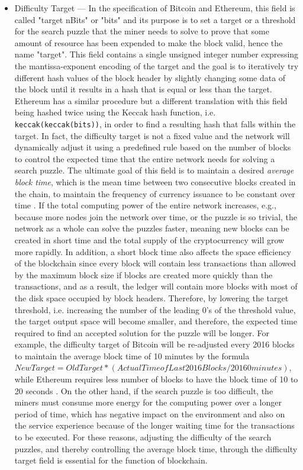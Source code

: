 \begin{itemize}
	\item Difficulty Target --- In the specification of Bitcoin and Ethereum, this field is called "target nBits" or "bits" and its purpose is to set a target or a threshold for the search puzzle that the miner needs to solve to prove that some amount of resource has been expended to make the block valid, hence the name "target". This field contains a single unsigned integer number expressing the mantissa-exponent encoding of the target and the goal is to iteratively try different hash values of the block header by slightly changing some data of the block until it results in a hash that is equal or less than the target. Ethereum has a similar procedure but a different translation with this field being hashed twice using the Keccak hash function, i.e. \texttt{keccak(keccak(bits))}, in order to find a resulting hash that falls within the target. 
	In fact, the difficulty target is not a fixed value and the network will dynamically adjust it using a predefined rule based on the number of blocks to control the expected time that the entire network needs for solving a search puzzle. The ultimate goal of this field is to maintain a desired \textit{average block time}, which is the mean time between two consecutive blocks created in the chain, to maintain the frequency of currency issuance to be constant over time . If the total computing power of the entire network increases, e.g., because more nodes join the network over time, or the puzzle is so trivial, the network as a whole can solve the puzzles faster, meaning new blocks can be created in short time and the total supply of the cryptocurrency will grow more rapidly. In addition, a short block time also affects the space efficiency of the blockchain since every block will contain less transactions than allowed by the maximum block size if blocks are created more quickly than the transactions, and as a result, the ledger will contain more blocks with most of the disk space occupied by block headers.
	Therefore, by lowering the target threshold, i.e. increasing the number of the leading 0's of the threshold value, the target output space will become smaller, and therefore, the expected time required to find an accepted solution for the puzzle will be longer. For example, the difficulty target of Bitcoin will be re-adjusted every 2016 blocks to maintain the average block time of 10 minutes by the formula $New Target = Old Target * (Actual Time of Last 2016 Blocks / 20160 minutes)$, while Ethereum requires less number of blocks to have the block time of 10 to 20 seconds \cite{antonopoulos2018mastering}. On the other hand, if the search puzzle is too difficult, the miners must consume more energy for the computing power over a longer period of time, which has negative impact on the environment and also on the service experience because of the longer waiting time for the transactions to be executed. For these reasons, adjusting the difficulty of the search puzzles, and thereby controlling the average block time, through the difficulty target field is essential for the function of blockchain.


\end{itemize}
